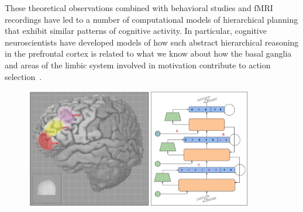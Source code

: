 \documentclass[letterpaper,11pt]{article}
\def\urlh#1{{}}
\begin{document}
These theoretical observations combined with behavioral studies and fMRI recordings have led to a number of computational models of hierarchical planning that exhibit similar patterns of cognitive activity. In particular, cognitive neuroscientists have developed models of how such abstract hierarchical reasoning in the prefrontal cortex is related to what we know about how the basal ganglia and areas of the limbic system involved in motivation contribute to action selection~\cite{OReillySCIENCE-06}. 


\begin{figure}
%
  \begin{center} 
    \includegraphics[height=150pt]{./figures/Prefrontal_Hierarchy_Biology_Graze.jpg} 
  \end{center}
%
  \caption{%
%
}
\end{figure}
\end{document}
